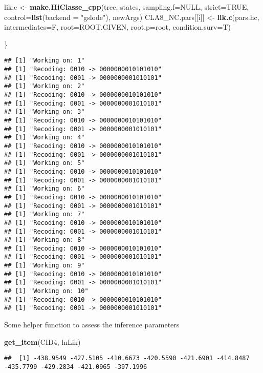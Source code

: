 \documentclass[
]{article}
\newenvironment{Shaded}{\begin{snugshade}}{\end{snugshade}}
\newcommand{\AttributeTok}[1]{\textcolor[rgb]{0.13,0.29,0.53}{#1}}
\newcommand{\ConstantTok}[1]{\textcolor[rgb]{0.56,0.35,0.01}{#1}}
\newcommand{\FunctionTok}[1]{\textcolor[rgb]{0.13,0.29,0.53}{\textbf{#1}}}
\newcommand{\NormalTok}[1]{#1}
\newcommand{\OtherTok}[1]{\textcolor[rgb]{0.56,0.35,0.01}{#1}}
\newcommand{\StringTok}[1]{\textcolor[rgb]{0.31,0.60,0.02}{#1}}
\begin{document}
\begin{Shaded}
\begin{Highlighting}[]
\NormalTok{  lik.c }\OtherTok{\textless{}{-}} \FunctionTok{make.HiClasse\_cpp}\NormalTok{(tree, states,  }\AttributeTok{sampling.f=}\ConstantTok{NULL}\NormalTok{,  }\AttributeTok{strict=}\ConstantTok{TRUE}\NormalTok{, }\AttributeTok{control=}\FunctionTok{list}\NormalTok{(}\AttributeTok{backend =} \StringTok{"gslode"}\NormalTok{), newArgs)}
\NormalTok{  CLA8\_NC.pars[[i]] }\OtherTok{\textless{}{-}} \FunctionTok{lik.c}\NormalTok{(pars.hc, }\AttributeTok{intermediates=}\NormalTok{F, }\AttributeTok{root=}\NormalTok{ROOT.GIVEN, }\AttributeTok{root.p=}\NormalTok{root, }\AttributeTok{condition.surv=}\NormalTok{T)}
  
\NormalTok{\}}
\end{Highlighting}
\end{Shaded}

\begin{verbatim}
## [1] "Working on: 1"
## [1] "Recoding: 0010 -> 0000000010101010"
## [1] "Recoding: 0001 -> 0000000001010101"
## [1] "Working on: 2"
## [1] "Recoding: 0010 -> 0000000010101010"
## [1] "Recoding: 0001 -> 0000000001010101"
## [1] "Working on: 3"
## [1] "Recoding: 0010 -> 0000000010101010"
## [1] "Recoding: 0001 -> 0000000001010101"
## [1] "Working on: 4"
## [1] "Recoding: 0010 -> 0000000010101010"
## [1] "Recoding: 0001 -> 0000000001010101"
## [1] "Working on: 5"
## [1] "Recoding: 0010 -> 0000000010101010"
## [1] "Recoding: 0001 -> 0000000001010101"
## [1] "Working on: 6"
## [1] "Recoding: 0010 -> 0000000010101010"
## [1] "Recoding: 0001 -> 0000000001010101"
## [1] "Working on: 7"
## [1] "Recoding: 0010 -> 0000000010101010"
## [1] "Recoding: 0001 -> 0000000001010101"
## [1] "Working on: 8"
## [1] "Recoding: 0010 -> 0000000010101010"
## [1] "Recoding: 0001 -> 0000000001010101"
## [1] "Working on: 9"
## [1] "Recoding: 0010 -> 0000000010101010"
## [1] "Recoding: 0001 -> 0000000001010101"
## [1] "Working on: 10"
## [1] "Recoding: 0010 -> 0000000010101010"
## [1] "Recoding: 0001 -> 0000000001010101"
\end{verbatim}

Some helper function to assess the inference parameters

\begin{Shaded}
\begin{Highlighting}[]
\FunctionTok{get\_item}\NormalTok{(CID4, }\StringTok{\textquotesingle{}lnLik\textquotesingle{}}\NormalTok{)}
\end{Highlighting}
\end{Shaded}

\begin{verbatim}
##  [1] -438.9549 -427.5105 -410.6673 -420.5590 -421.6901 -414.8487 -435.7799 -429.2834 -421.0965 -397.1996
\end{verbatim}
\end{document}

